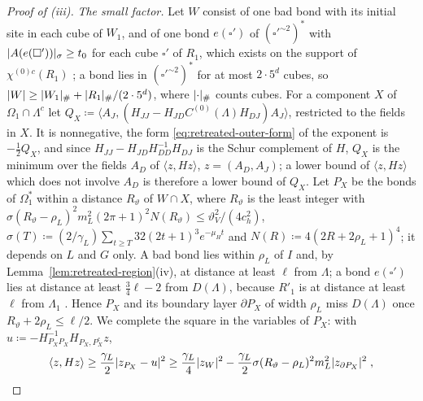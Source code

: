 \documentclass[11pt]{preprint}
\DeclarePairedDelimiter{\abs}{\lvert}{\rvert}
\numberwithin{equation}{section}
\theoremstyle{definition}
\theoremstyle{remark}
\theoremstyle{plain}
\begin{document}
\begin{proof}[Proof of (iii)]
\emph{The small factor.} Let $W$ consist of one bad bond with its initial site in each cube of $W_1$, and of one bond $e(\square')$ of $(\square'^{\sim2})^*$ with $\abs{A(e(\square'))}_\sigma \geq t_0$ for each cube $\square'$ of $R_1$, which exists on the support of $\chi^{(0)c}(R_1)$ \cite[(1.18), p.~250]{BalabanCRE}; a bond lies in $(\square'^{\sim2})^*$ for at most $2 \cdot 5^d$ cubes, so $\abs{W} \geq \abs{W_1}_\# + \abs{R_1}_\#/(2 \cdot 5^d)$, where $\abs{\cdot}_\#$ counts cubes. For a component $X$ of $\Omega_1 \cap \Lambda^c$ let $Q_X \coloneqq \langle A_J, (H_{JJ} - H_{JD}C^{(0)}(\Lambda)H_{DJ})A_J\rangle$, restricted to the fields in $X$. It is nonnegative, the form \eqref{eq:retreated-outer-form} of the exponent is $-\frac12Q_X$, and since $H_{JJ} - H_{JD}H_{DD}^{-1}H_{DJ}$ is the Schur complement of $H$, $Q_X$ is the minimum over the fields $A_D$ of $\langle z, Hz\rangle$, $z = (A_D, A_J)$; a lower bound of $\langle z, Hz\rangle$ which does not involve $A_D$ is therefore a lower bound of $Q_X$. Let $P_X$ be the bonds of $\Omega_1^*$ within a distance $R_\vartheta$ of $W \cap X$, where $R_\vartheta$ is the least integer with $\sigma(R_\vartheta - \rho_L)^2m_L^2(2\pi + 1)^2N(R_\vartheta) \leq \vartheta_V^2/(4c_h^2)$, $\sigma(T) \coloneqq (2/\gamma_L)\sum_{t \geq T}32(2t + 1)^3e^{-\mu_Ht}$ and $N(R) \coloneqq 4(2R + 2\rho_L + 1)^4$; it depends on $L$ and $G$ only. A bad bond lies within $\rho_L$ of $I$ and, by Lemma~\ref{lem:retreated-region}(iv), at distance at least $\ell$ from $\Lambda$; a bond $e(\square')$ lies at distance at least $\frac34\ell - 2$ from $D(\Lambda)$, because $R'_1$ is at distance at least $\ell$ from $\Lambda_1$ \cite[Lemma~3.11(i)]{WilsonFirstStep}. Hence $P_X$ and its boundary layer $\partial P_X$ of width $\rho_L$ miss $D(\Lambda)$ once $R_\vartheta + 2\rho_L \leq \ell/2$. We complete the square in the variables of $P_X$: with $u \coloneqq -H_{P_XP_X}^{-1}H_{P_X, P_X^c}z$,
\[
    \langle z, Hz\rangle \geq \frac{\gamma_L}{2}\abs{z_{P_X} - u}^2 \geq \frac{\gamma_L}{4}\abs{z_W}^2 - \frac{\gamma_L}{2}\sigma(R_\vartheta - \rho_L)^2m_L^2\abs{z_{\partial P_X}}^2\;,
\]

\end{proof}
\end{document}
